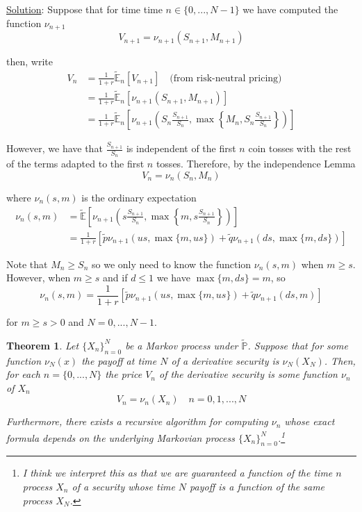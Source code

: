 \documentclass[12pt]{article}
\newtheorem{theorem}{Theorem}
\newlength\tindent
\renewcommand{\indent}{\hspace*{\tindent}}
\renewcommand{\P}{\mathbb P}
\newcommand{\E}{\mathbb E}
\begin{document}
\underline{Solution}: Suppose that for time time $n \in \{0,..., N - 1\}$ we have computed the function $\nu_{n + 1}$
\begin{equation*}
	V_{n + 1} = \nu_{n + 1}(S_{n + 1}, M_{n + 1})
\end{equation*}

then, write
\begin{align*}
	V_n &= \frac{1}{1 + r}\tilde{\E}_n[V_{n + 1}] \quad \text{(from risk-neutral pricing)} \\
	&= \frac{1}{1 + r} \tilde{\E}_n \left[ \nu_{n + 1}(S_{n +1},M_{n + 1}) \right] \\
	&= \frac{1}{1 + r} \tilde{\E}_n \left[ \nu_{n + 1} \left( S_n \frac{S_{n + 1}}{S_n}, \max \left\{M_n, S_n \frac{S_{n + 1}}{S_n} \right\} \right) \right]
\end{align*}

\indent However, we have that $\frac{S_{n + 1}}{S_n}$ is independent of the first $n$ coin tosses with the rest of the terms adapted to the first $n$ tosses. Therefore, by the independence Lemma
\begin{equation*}
	V_n = \nu_n(S_n, M_n)
\end{equation*}

where $\nu_n(s, m)$ is the ordinary expectation
\begin{align*}
	\nu_n(s, m) &= \tilde{\E} \left[ \nu_{n + 1} \left( s \frac{S_{n + 1}}{S_n}, \max \left\{m, s \frac{S_{n + 1}}{S_n} \right\} \right) \right]  \\
	&= \frac{1}{1 + r} [\tilde{p}\nu_{n + 1}(us, \max \{m, us \}) + \tilde{q}\nu_{n + 1}(ds, \max \{ m, ds \})]
\end{align*}

\indent Note that $M_n \geq S_n$ so we only need to know the function $\nu_n(s, m)$ when $m \geq s$. However, when $m \geq s$ and if $d \leq 1$ we have $\max \{ m, ds\} = m$, so
\begin{equation*}
	\nu_n(s, m) = \frac{1}{1 + r}[ \tilde{p}\nu_{n + 1}(us, \max \{ m, us \}) + \tilde{q}\nu_{n + 1}(ds, m)]
\end{equation*}

for $m \geq s > 0$ and $N = 0, ..., N - 1$. \\

\begin{theorem} Let $\{X_n\}^N_{n = 0}$ be a Markov process under $\tilde{\P}$. Suppose that for some function $\nu_N(x)$ the payoff at time $N$ of a derivative security is $\nu_N(X_N)$. Then, for each $n = \{0,..., N\}$ the price $V_n$ of the derivative security is some function $\nu_n$ of $X_n$
\begin{equation*}
	V_n = \nu_n(X_n) \quad n = 0, 1, ..., N
\end{equation*}

\indent Furthermore, there exists a recursive algorithm for computing $\nu_n$ whose exact formula depends on the underlying Markovian process $\{X_n\}^N_{n = 0}$.\footnote{I think we interpret this as that we are guaranteed a function of the time $n$ process $X_n$ of a security whose time $N$ payoff is a function of the same process $X_N$.}
\end{theorem}
\end{document}
